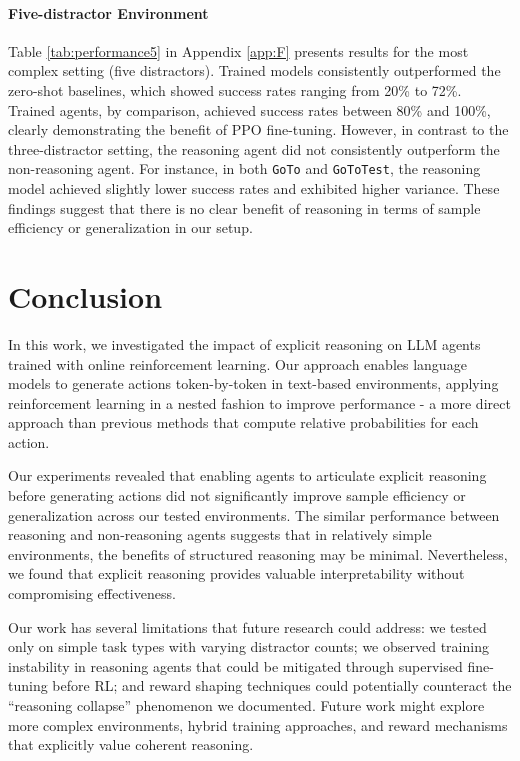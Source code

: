 \documentclass[11pt,a4paper]{article}
\begin{document}
\paragraph{Five-distractor Environment}
Table \ref{tab:performance5} in Appendix \ref{app:F} presents results for the most complex setting (five distractors). Trained models consistently outperformed the zero-shot baselines, which showed success rates ranging from 20\% to 72\%. Trained agents, by comparison, achieved success rates between 80\% and 100\%, clearly demonstrating the benefit of PPO fine-tuning. However, in contrast to the three-distractor setting, the reasoning agent did not consistently outperform the non-reasoning agent. For instance, in both \texttt{GoTo} and \texttt{GoToTest}, the reasoning model achieved slightly lower success rates and exhibited higher variance. These findings suggest that there is no clear benefit of reasoning in terms of sample efficiency or generalization in our setup.

\section{Conclusion}
In this work, we investigated the impact of explicit reasoning on LLM agents trained with online reinforcement learning. 
Our approach enables language models to generate actions token-by-token in text-based environments, 
applying reinforcement learning in a nested fashion to improve performance - 
a more direct approach than previous methods that compute relative probabilities for each action.

Our experiments revealed that enabling agents to articulate explicit reasoning before generating actions 
did not significantly improve sample efficiency or generalization across our tested environments. 
The similar performance between reasoning and non-reasoning agents suggests that in relatively simple environments, 
the benefits of structured reasoning may be minimal.
Nevertheless, we found that explicit reasoning provides valuable interpretability without compromising effectiveness. 

Our work has several limitations that future research could address: 
we tested only on simple task types with varying distractor counts; 
we observed training instability in reasoning agents that could be mitigated through supervised fine-tuning before RL; 
and reward shaping techniques could potentially counteract the ``reasoning collapse'' phenomenon we documented.
Future work might explore more complex environments, hybrid training approaches, and reward mechanisms that explicitly value coherent reasoning.


\end{document}
